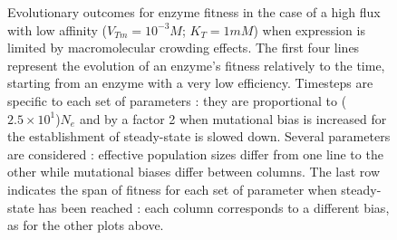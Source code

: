 \begin{figure}[H]
\begin{center}
\vspace{-0.1cm}
\caption{\small Evolutionary outcomes for enzyme fitness in the case of a high flux with low affinity ($V_{Tm}=10^{-3}M$; $K_T=1 mM$) when expression is limited by macromolecular crowding effects. The first four lines represent the evolution of an enzyme's fitness relatively to the time, starting from an enzyme with a very low efficiency. Timesteps are specific to each set of parameters : they are proportional to ($2.5\times 10^1$)$N_e$ and by a factor 2 when mutational bias is increased for the establishment of steady-state is slowed down. Several parameters are considered : effective population sizes differ from one line to the other while mutational biases differ between columns. The last row indicates the span of fitness for each set of parameter when steady-state has been reached : each column corresponds to a different bias, as for the other plots above.\normalsize}
\label{fig8b-ann}
\end{center}
\end{figure}

